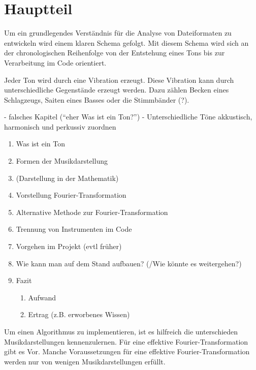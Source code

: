 \chapter{Hauptteil}
%


Um ein grundlegendes Verständnis für die Analyse von Dateiformaten zu entwickeln wird einem klaren Schema gefolgt. Mit diesem Schema wird sich an der chronologischen Reihenfolge von der Entstehung eines Tons bis zur Verarbeitung im Code orientiert.

\par

Jeder Ton wird durch eine Vibration erzeugt. Diese Vibration kann durch unterschiedliche Gegenstände erzeugt werden. Dazu zählen Becken eines Schlagzeugs, Saiten eines Basses oder die Stimmbänder (?).

- falsches Kapitel (\enquote{eher Was ist ein Ton?})
- Unterschiedliche Töne akkustisch, harmonisch und perkussiv zuordnen

%
\begin{enumerate}
    \item Was ist ein Ton
    \item Formen der Musikdarstellung
    \item (Darstellung in der Mathematik)
    \item Vorstellung Fourier-Transformation
    \item Alternative Methode zur Fourier-Transformation
    \item Trennung von Instrumenten im Code
    \item Vorgehen im Projekt (evtl früher)
    \item Wie kann man auf dem Stand aufbauen? (/Wie könnte es weitergehen?)
    \item Fazit
    \begin{enumerate}
        \item Aufwand
        \item Ertrag (z.B. erworbenes Wissen)
    \end{enumerate}
\end{enumerate}
%

Um einen Algorithmus zu implementieren, ist es hilfreich die unterschieden Musikdarstellungen kennenzulernen. Für eine effektive Fourier-Transformation gibt es Vor. Manche Voraussetzungen für eine effektive Fourier-Transformation werden nur von wenigen Musikdarstellungen erfüllt.

